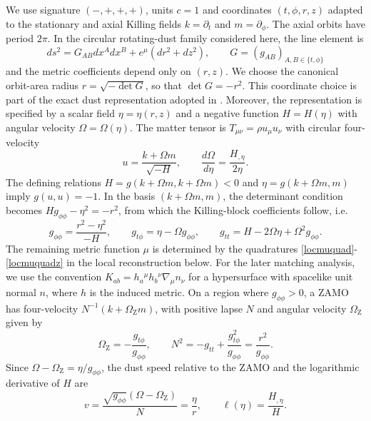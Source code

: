 \documentclass[amsmath,amsfonts,amssymb,aps,pra,superscriptaddress,10pt]{revtex4-2}
\numberwithin{equation}{section}
\theoremstyle{plain}
\theoremstyle{definition}
\theoremstyle{remark}
\theoremstyle{definition}
\newcommand{\OmZ}{\Omega_{\mathrm Z}}
\begin{document}
We use signature $(-,+,+,+)$, units $c=1$ and coordinates $(t,\phi,r,z)$ adapted to the stationary and axial Killing fields $k=\partial_t$ and $m=\partial_\phi$. The axial orbits have period $2\pi$. In the circular rotating-dust family considered here, the line element is
\begin{equation}
ds^2=G_{AB}dx^A dx^B+e^\mu(dr^2+dz^2),\qquad
G=(g_{AB})_{A,B\in\{t,\phi\}}
\end{equation}
and the metric coefficients depend only on $(r,z)$. We choose the canonical orbit-area radius $r=\sqrt{-\det G}$, so that $\det G=-r^2$. This coordinate choice is part of the exact dust representation adopted in \cite{Winicour1975JMP,Astesiano2022EPJC}. Moreover, the representation is specified by a scalar field $\eta=\eta(r,z)$ and a negative function $H=H(\eta)$  with angular velocity $\Omega=\Omega(\eta)$. The matter tensor is $T_{\mu\nu}=\rho u_\mu u_\nu$ with circular four-velocity
\begin{equation}\label{modvelrel}
u=\frac{k+\Omega m}{\sqrt{-H}},\qquad
\frac{d\Omega}{d\eta}=\frac{H_{,\eta}}{2\eta}.
\end{equation}
The defining relations $H=g(k+\Omega m,k+\Omega m)<0$ and $\eta=g(k+\Omega m,m)$ imply $g(u,u)=-1$. In the basis $(k+\Omega m,m)$, the determinant condition becomes $H g_{\phi\phi}-\eta^2=-r^2$, from which the Killing-block coefficients follow, i.e. 
\begin{equation}\label{modmetcomp}
g_{\phi\phi}=\frac{r^2-\eta^2}{-H},\qquad
g_{t\phi}=\eta-\Omega g_{\phi\phi},\qquad
g_{tt}=H-2\Omega\eta+\Omega^2 g_{\phi\phi}.
\end{equation}
The remaining metric function $\mu$ is determined by the quadratures \eqref{locmuquad}-\eqref{locmuquadz} in the local reconstruction below. For the later matching analysis, we use the convention $K_{ab}=h_a{}^\mu h_b{}^\nu\nabla_\mu n_\nu$ for a hypersurface with spacelike unit normal $n$, where $h$ is the induced metric. On a region where $g_{\phi\phi}>0$, a ZAMO has four-velocity $N^{-1}(k+\OmZ m)$, with positive lapse $N$ and angular velocity $\OmZ$ given by
\begin{equation}
\OmZ=-\frac{g_{t\phi}}{g_{\phi\phi}},\qquad
N^2=-g_{tt}+\frac{g_{t\phi}^2}{g_{\phi\phi}}=\frac{r^2}{g_{\phi\phi}}.
\end{equation}
Since $\Omega-\OmZ=\eta/g_{\phi\phi}$, the dust speed relative to the ZAMO and the logarithmic derivative of $H$ are
\begin{equation}\label{v_ell}
v=\frac{\sqrt{g_{\phi\phi}}(\Omega-\OmZ)}{N}=\frac{\eta}{r},\qquad
\ell(\eta)=\frac{H_{,\eta}}{H}.
\end{equation}
\end{document}
